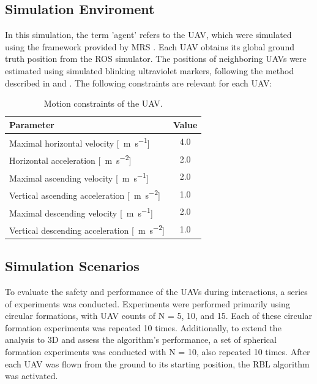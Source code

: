     \subsection{Simulation Enviroment}
        In this simulation, the term 'agent' refers to the \ac{UAV}, which were simulated using the framework provided by \ac{MRS} \cite{mrs_uav_system}.
        Each \ac{UAV} obtains its global ground truth position from the ROS simulator.
        The positions of neighboring \ac{UAV}s were estimated using simulated blinking ultraviolet markers, following the method described in \cite{uvdd1} and \cite{uvdar_package}.
        The following constraints are relevant for each \ac{UAV}:
        \begin{table}[h]
            \centering
            \renewcommand{\arraystretch}{1.1}
            \begin{tabular}{|l|c|}
                \hline
                \textbf{Parameter} & \textbf{Value} \\ \hline
                    Maximal horizontal velocity [\SI{}{\meter\per\second}] & 4.0 \\ \hline
                    Horizontal acceleration [\SI{}{\meter\per\second\squared}] & 2.0 \\ \hline
                    Maximal ascending velocity [\SI{}{\meter\per\second}] & 2.0 \\ \hline
                    Vertical ascending acceleration [\SI{}{\meter\per\second\squared}] & 1.0 \\ \hline
                    Maximal descending velocity [\SI{}{\meter\per\second}] & 2.0 \\ \hline
                    Vertical descending acceleration [\SI{}{\meter\per\second\squared}] & 1.0 \\ \hline
                \end{tabular}
                \caption{Motion constraints of the \ac{UAV}.}
            \label{tab:uav_constraints}
        \end{table}
        
    \subsection{Simulation Scenarios}
        To evaluate the safety and performance of the \ac{UAV}s during interactions, a series of experiments was conducted. 
        Experiments were performed primarily using circular formations, with \ac{UAV} counts of N = 5, 10, and 15. 
        Each of these circular formation experiments was repeated 10 times.
        Additionally, to extend the analysis to \ac{3D} and assess the algorithm's performance, a set of spherical formation experiments was conducted with N = 10, also repeated 10 times.
        After each \ac{UAV} was flown from the ground to its starting position, the \ac{RBL} algorithm was activated.    

